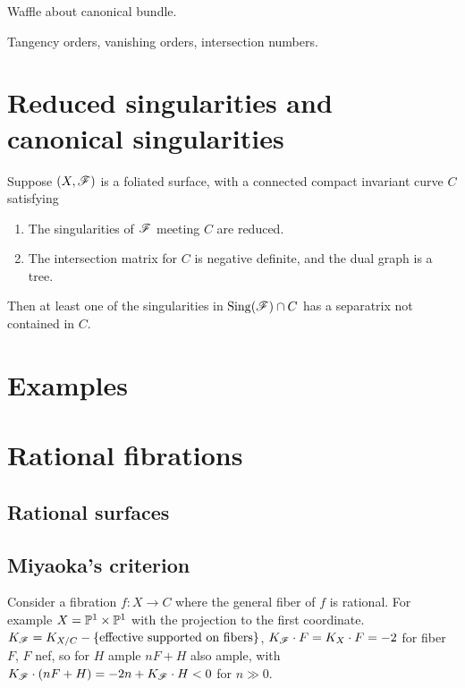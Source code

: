 Waffle about canonical bundle.

Tangency orders, vanishing orders, intersection numbers.

\section{Reduced singularities and canonical singularities}\label{sec:canonical}



\begin{theorem}\label{thm:reduced separatrix}
    Suppose $(X,\scrF)$ is a foliated surface, with a connected compact
    invariant curve $C$ satisfying
    \begin{enumerate}[label=\roman*.]
        \item The singularities of $\scrF$ meeting $C$ are reduced.
        \item The intersection matrix for $C$ is negative definite, and the dual
            graph is a tree.
    \end{enumerate}
    Then at least one of the singularities in $\Sing(\scrF)\cap C$ has a
    separatrix not contained in $C$.
\end{theorem}

\section{Examples}


\section{Rational fibrations}


\subsection{Rational surfaces}

\subsection{Miyaoka's criterion}

Consider a fibration $f:X\to C$ where the general fiber of $f$ is rational. For
example $X=\P^1\times\P^1$ with the projection to the first coordinate.
$K_\scrF=K_{X/C}-\{\text{effective supported on fibers}\}$,
$K_\scrF\cdot F=K_X\cdot F=-2$ for fiber $F$, $F$ nef, so for $H$ ample $nF+H$
also ample, with $K_\scrF\cdot(nF+H)=-2n+K_\scrF\cdot H<0$ for $n\gg0$.

